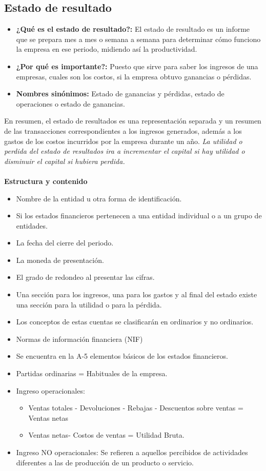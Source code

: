 \documentclass[letter,12pt]{article}
\begin{document}
	\subsection{Estado de resultado}
			\begin{itemize}
				\item \textbf{¿Qué es el estado de resultado?:} El estado de resultado es un informe que se prepara mes a mes o semana a semana para determinar cómo funciono la empresa en ese periodo, midiendo así la productividad.
				\item \textbf{¿Por qué es importante?:} Puesto que sirve para saber los ingresos de una empresas, cuales son los costos, si la empresa obtuvo ganancias o pérdidas.
				\item \textbf{Nombres sinónimos:} Estado de ganancias y pérdidas, estado de operaciones o estado de ganancias.
			\end{itemize}
			En resumen, el estado de resultados es una representación separada y un resumen de las transacciones correspondientes a los ingresos generados, además a los gastos de los costos incurridos por la empresa durante un año. \textit{La utilidad o perdida del estado de resultados ira a incrementar el capital si hay utilidad o disminuir el capital si hubiera perdida.}	\\\\
			\textbf{Estructura y contenido}
			\begin{itemize}
				\item Nombre de la entidad u otra forma de identificación.
				\item Si los estados financieros pertenecen a una entidad individual o a un grupo de entidades.
				\item La fecha del cierre del periodo.
				\item La moneda de presentación.
				\item El grado de redondeo al presentar las cifras.
				\item Una sección para los ingresos, una para los gastos y al final del estado existe una sección para la utilidad o para la pérdida.
				\item Los conceptos de estas cuentas se clasificarán en ordinarios y no ordinarios. 
				\item Normas de información financiera (NIF)
				\item Se encuentra en la A-5 elementos básicos de los estados financieros.
				\item Partidas ordinarias = Habituales de la empresa.
				\item Ingreso operacionales:
					\begin{itemize}
						\item Ventas totales - Devoluciones - Rebajas - Descuentos sobre ventas = Ventas netas
						\item Ventas netas- Costos de ventas = Utilidad Bruta.
					\end{itemize} 
				\item Ingreso NO operacionales: Se refieren a aquellos percibidos de actividades diferentes a las de producción de un producto o servicio.
			\end{itemize}
			
\end{document}
